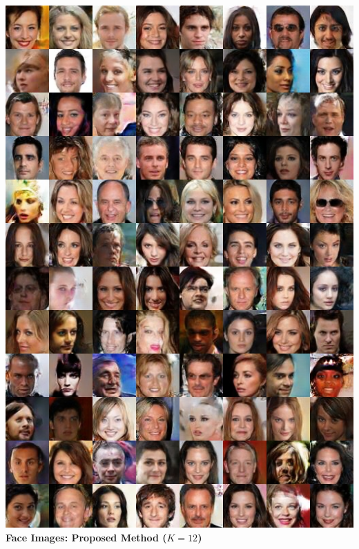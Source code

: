 \documentclass{article}
\begin{document}
\includegraphics[width=1.0\textwidth]{Figs/sup/fk24.jpg}\\
\clearpage
\textbf{Face Images: Proposed Method ($K=12$)}\\
\end{document}
